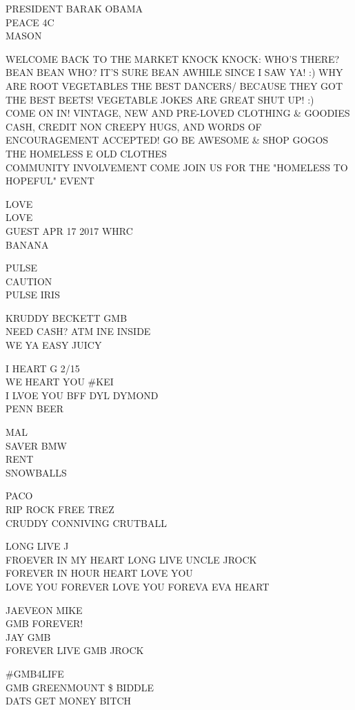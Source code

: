 \documentclass[10pt,letterpaper]{article}
\begin{document}
PRESIDENT BARAK OBAMA\\
PEACE 4C\\
MASON

WELCOME BACK TO THE MARKET KNOCK KNOCK: WHO'S THERE? BEAN BEAN WHO?  IT'S SURE BEAN AWHILE SINCE I SAW YA!  :) WHY ARE ROOT VEGETABLES THE BEST DANCERS/  BECAUSE THEY GOT THE BEST BEETS!  VEGETABLE JOKES ARE GREAT SHUT UP! :)\\
COME ON IN!  VINTAGE, NEW AND PRE{-}LOVED CLOTHING \& GOODIES CASH, CREDIT NON CREEPY HUGS, AND WORDS OF ENCOURAGEMENT ACCEPTED!  GO BE AWESOME \& SHOP GOGOS\\
THE HOMELESS E OLD CLOTHES\\
COMMUNITY INVOLVEMENT COME JOIN US FOR THE "HOMELESS TO HOPEFUL" EVENT

LOVE\\
LOVE\\
GUEST APR 17 2017 WHRC\\
BANANA

PULSE\\
CAUTION\\
PULSE IRIS

KRUDDY BECKETT GMB\\
NEED CASH?  ATM INE INSIDE\\
WE YA EASY JUICY

I HEART G 2/15\\
WE HEART YOU \#KEI\\
I LVOE YOU BFF DYL DYMOND\\
PENN BEER

MAL\\
SAVER BMW\\
RENT\\
SNOWBALLS

PACO\\
RIP ROCK FREE TREZ\\
CRUDDY CONNIVING CRUTBALL

LONG LIVE J\\
FROEVER IN MY HEART LONG LIVE UNCLE JROCK\\
FOREVER IN HOUR HEART LOVE YOU\\
LOVE YOU FOREVER LOVE YOU FOREVA EVA HEART

JAEVEON MIKE\\
GMB FOREVER!\\
JAY GMB\\
FOREVER LIVE GMB JROCK

\#GMB4LIFE\\
GMB GREENMOUNT \$ BIDDLE\\
DATS GET MONEY BITCH
\end{document}
